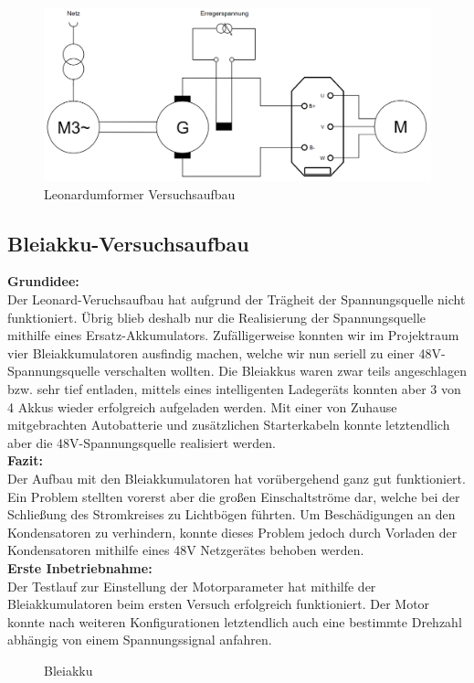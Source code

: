 \begin{figure}[H]
	\begin{center}
		\includegraphics[width=\textwidth]{figures/antrieb/Leonard_Umformer.png}
		\caption{Leonardumformer Versuchsaufbau}
	\end{center}
\end{figure}


\newpage

\subsection{Bleiakku-Versuchsaufbau}

\textbf{Grundidee:}
\\[2mm]
Der Leonard-Veruchsaufbau hat aufgrund der Trägheit der Spannungsquelle nicht funktioniert. Übrig blieb deshalb nur die Realisierung der Spannungsquelle mithilfe eines Ersatz-Akkumulators. Zufälligerweise konnten wir im Projektraum vier Bleiakkumulatoren ausfindig machen, welche wir nun seriell zu einer 48V-Spannungsquelle verschalten wollten. Die Bleiakkus waren zwar teils angeschlagen bzw. sehr tief entladen, mittels eines intelligenten Ladegeräts konnten aber 3 von 4 Akkus wieder erfolgreich aufgeladen werden. Mit einer von Zuhause mitgebrachten Autobatterie und zusätzlichen Starterkabeln konnte letztendlich aber die 48V-Spannungsquelle realisiert werden.
\\[5mm]

\textbf{Fazit:}
\\[2mm]
Der Aufbau mit den Bleiakkumulatoren hat vorübergehend ganz gut funktioniert. Ein Problem stellten vorerst aber die großen Einschaltströme dar, welche bei der Schließung des Stromkreises zu Lichtbögen führten. Um Beschädigungen an den Kondensatoren zu verhindern, konnte dieses Problem jedoch durch Vorladen der Kondensatoren mithilfe eines 48V Netzgerätes behoben werden.
\\[5mm]

\textbf{Erste Inbetriebnahme:}
\\[2mm]
Der Testlauf zur Einstellung der Motorparameter hat mithilfe der Bleiakkumulatoren beim ersten Versuch erfolgreich funktioniert. Der Motor konnte nach weiteren Konfigurationen letztendlich auch eine bestimmte Drehzahl abhängig von einem Spannungssignal anfahren. 


\begin{figure}[H]
	\begin{center}
		\caption{Bleiakku}
	\end{center}
\end{figure}

\newpage